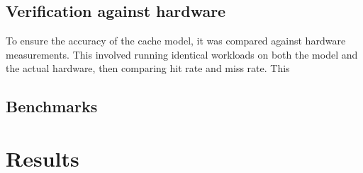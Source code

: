 \subsection{Verification against hardware}
To ensure the accuracy of the cache model, it was compared against hardware measurements. This involved running identical workloads on both the model and the actual hardware, then
comparing hit rate and miss rate. This 

\subsection{Benchmarks}


\section{Results}
